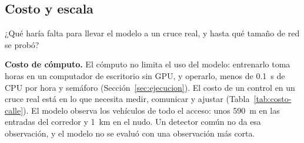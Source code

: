 \subsection{Costo y escala}
\label{sec:costo-escala}

¿Qué haría falta para llevar el modelo a un cruce real, y hasta qué
tamaño de red se probó?

\noindent\textbf{Costo de cómputo.} El cómputo no limita el uso del
modelo: entrenarlo toma horas en un computador de escritorio sin GPU, y
operarlo, menos de 0.1~s de CPU por hora y semáforo
(Sección~\ref{sec:ejecucion}). El costo
de un control en un cruce real está en lo que necesita medir, comunicar
y ajustar (Tabla~\ref{tab:costo-calle}). El modelo observa los
vehículos de todo el acceso: unos 590~m en las entradas del corredor y
1~km en el nudo. Un detector común no da esa observación, y el modelo no
se evaluó con una observación más corta.

